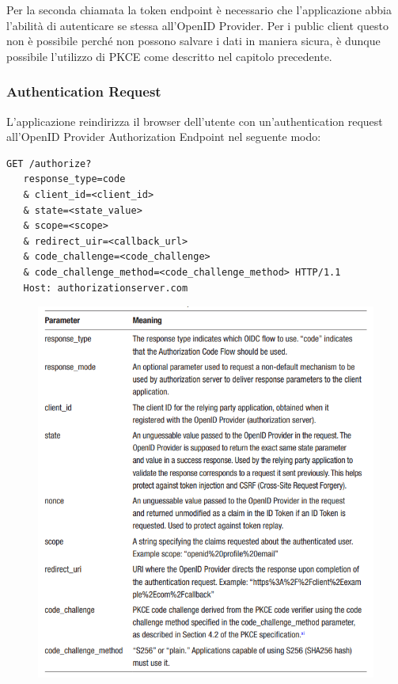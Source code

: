 Per la seconda chiamata la token endpoint è necessario che l'applicazione abbia
l'abilità di autenticare se stessa all'OpenID Provider. Per i public client questo
non è possibile perché non possono salvare i dati in maniera sicura, è dunque possibile
l'utilizzo di PKCE come descritto nel capitolo precedente.

\subsubsection{Authentication Request}

L'applicazione reindirizza il browser dell'utente con un'authentication request
all'OpenID Provider Authorization Endpoint nel seguente modo:

\begin{lstlisting}
GET /authorize?
   response_type=code
   & client_id=<client_id>
   & state=<state_value>
   & scope=<scope>
   & redirect_uir=<callback_url>
   & code_challenge=<code_challenge>
   & code_challenge_method=<code_challenge_method> HTTP/1.1
   Host: authorizationserver.com
\end{lstlisting}

\begin{figure}[H]
      \centering
      \includegraphics[width=\textwidth, keepaspectratio]{capitoli/id_managing/imgs/codeflowtab.png}
\end{figure}

